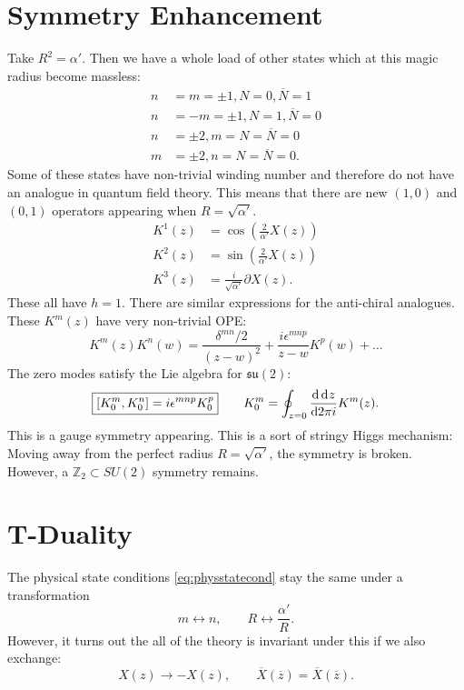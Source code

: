 \section{Symmetry Enhancement}%
\label{sec:symmetry_enha}

Take $R^2 = \alpha'$. Then we have a whole load of other states which at this magic radius become massless:
\begin{align}
  n &= m = \pm 1, N = 0, \overline{N}{} = 1 \\
  n &= -m = \pm 1, N = 1, \overline{N}{} = 0 \\
  n &= \pm 2, m = N = \overline{N}{} = 0 \\
  m &= \pm 2, n = N = \overline{N}{} = 0.
\end{align}
Some of these states have non-trivial winding number and therefore do not have an analogue in quantum field theory.
This means that there are new $(1, 0)$ and $(0, 1)$ operators appearing when $R = \sqrt{\alpha'}$.
\begin{align}
  K^1(z) &= \cos(\frac{2}{\alpha'} X(z)) \\
  K^2(z) &= \sin(\frac{2}{\alpha'} X(z)) \\
  K^3(z) &= \frac{i}{\sqrt{\alpha'}} \partial X(z).
\end{align}
These all have $h = 1$. There are similar expressions for the anti-chiral analogues.
These $K^m(z)$ have very non-trivial OPE:
\begin{equation}
  K^m(z) K^n(w) = \frac{\delta^{mn} / 2}{(z - w)^2} + \frac{i \epsilon^{mnp}}{z - w} K^{p}(w) + \dots
\end{equation}
The zero modes satisfy the Lie algebra for $\mathfrak{su}(2)$:
\begin{equation}
  \boxed{[K_0^{m}, K^{n}_0] = i \epsilon^{mnp} K^{p}_0}  \qquad K^{m}_0 = \oint_{z = 0} \dv{\dd[]{z}}{2\pi i} K^{m}(z).
\end{equation}
This is a gauge symmetry appearing. This is a sort of stringy Higgs mechanism:
Moving away from the perfect radius $R = \sqrt{\alpha'}$, the symmetry is broken. However, a $\mathbb{Z}_2 \subset SU(2)$ symmetry remains.

\section{T-Duality}%
\label{sec:t_duality}

The physical state conditions \eqref{eq:physstatecond} stay the same under a transformation
\begin{equation}
  m \leftrightarrow n, \qquad R \leftrightarrow \frac{\alpha'}{R}.
\end{equation}
However, it turns out the all of the theory is invariant under this if we also exchange:
\begin{equation}
  X(z) \to - X(z), \qquad \overline{X}(\overline{z}{}) = \overline{X}{}(\overline{z}{}).
\end{equation}

